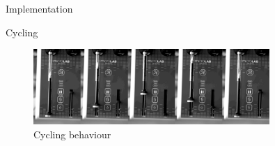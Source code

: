 \documentclass[a0paper,landscape,fontscale=0.32]{baposter}
\begin{document}
\begin{poster}
\begin{posterbox}[name=implementation,column=1,span=2]{Implementation}
\end{posterbox}
\begin{posterbox}[name=cycling,column=1,span=2,below=implementation]{Cycling}
\begin{figure}[H]
    \begin{center}
    \includegraphics[width=0.8\textwidth]{images/combined}
    \end{center}
    \vspace{-1.2em}
  \caption{Cycling behaviour}
\end{figure}
\begin{multicols}{2}
\end{multicols}
\end{posterbox}


\end{poster}
\end{document}
